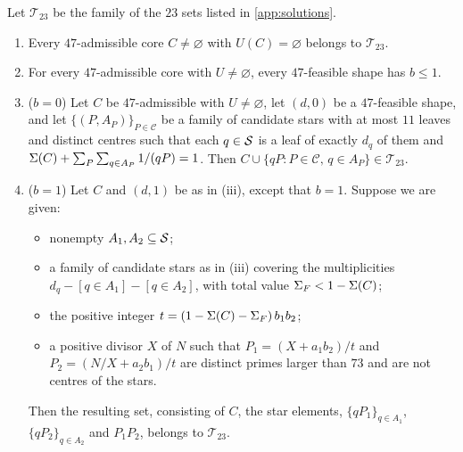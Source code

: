 \documentclass[11pt]{article}
\begin{document}
\begin{claim}\label{claim:47}
Let $\mathcal{T}_{23}$ be the family of the $23$ sets listed in \cref{app:solutions}.
\begin{enumerate}[label=\textup{(\roman*)}]
\item Every $47$-admissible core $C\ne\varnothing$ with $U(C)=\varnothing$ belongs to $\mathcal{T}_{23}$.
\item For every $47$-admissible core with $U\ne\varnothing$, every $47$-feasible shape has $b\le1$.
\item \textup{($b=0$)} Let $C$ be $47$-admissible with $U\ne\varnothing$, let $(d,0)$ be a $47$-feasible shape, and let $\{(P,A_P)\}_{P\in\mathcal{C}}$ be a family of candidate stars with at most $11$ leaves and distinct centres such that each $q\in\mathcal{S}$ is a leaf of exactly $d_q$ of them and $\Sigma(C)+\sum_{P}\sum_{q\in A_P}1/(qP)=1$. Then $C\cup\{qP: P\in\mathcal{C},\,q\in A_P\}\in\mathcal{T}_{23}$.
\item \textup{($b=1$)} Let $C$ and $(d,1)$ be as in (iii), except that $b=1$. Suppose we are given:
  \begin{itemize}
  \item nonempty $A_1,A_2\subseteq\mathcal{S}$;
  \item a family of candidate stars as in (iii) covering the multiplicities $d_q-[q\in A_1]-[q\in A_2]$, with total value $\Sigma_F<1-\Sigma(C)$;
  \item the positive integer $t=(1-\Sigma(C)-\Sigma_F)\,b_1b_2$;
  \item a positive divisor $X$ of $N$ such that $P_1=(X+a_1b_2)/t$ and $P_2=(N/X+a_2b_1)/t$ are distinct primes larger than $73$ and are not centres of the stars.
  \end{itemize}
  Then the resulting set, consisting of $C$, the star elements, $\{qP_1\}_{q\in A_1}$, $\{qP_2\}_{q\in A_2}$ and $P_1P_2$, belongs to $\mathcal{T}_{23}$.
\end{enumerate}
\end{claim}
\end{document}
